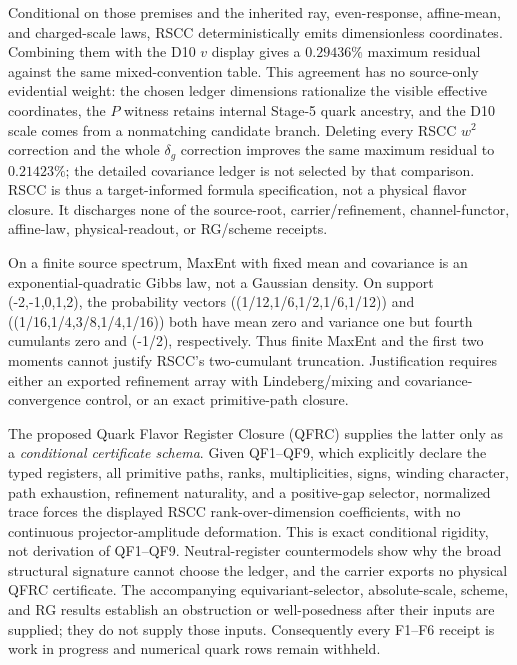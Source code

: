 \documentclass[11pt]{article}
\begin{document}
Conditional on those premises and the inherited ray, even-response, affine-mean, and charged-scale
laws, RSCC deterministically emits dimensionless coordinates.  Combining them with the D10
\(v\) display gives a \(0.29436\%\) maximum residual against the same mixed-convention table. This
agreement has no source-only evidential weight: the chosen ledger dimensions rationalize the visible
effective coordinates, the \(P\) witness retains internal Stage-5 quark ancestry, and the D10 scale
comes from a nonmatching candidate branch.  Deleting every RSCC \(w^2\) correction and
the whole \(\delta_g\) correction improves the same maximum residual to
\(0.21423\%\); the detailed covariance ledger is not selected by that comparison.  RSCC is thus a
target-informed formula specification, not a physical flavor closure. It
discharges none of the source-root, carrier/refinement, channel-functor, affine-law, physical-readout,
or RG/scheme receipts.

On a finite source spectrum, MaxEnt with fixed mean and covariance is an
exponential-quadratic Gibbs law, not a Gaussian density.  On support
({-2,-1,0,1,2}), the probability vectors
((1/12,1/6,1/2,1/6,1/12)) and
((1/16,1/4,3/8,1/4,1/16)) both have mean zero and variance one but fourth cumulants
zero and (-1/2), respectively.  Thus finite MaxEnt and the first two moments cannot justify
RSCC's two-cumulant truncation. Justification requires either an exported refinement
array with Lindeberg/mixing and covariance-convergence control, or an exact primitive-path closure.

The proposed Quark Flavor Register Closure (QFRC) supplies the latter only as a
\emph{conditional certificate schema}.  Given QF1--QF9, which explicitly declare the typed
registers, all primitive paths, ranks, multiplicities, signs, winding character, path exhaustion,
refinement naturality, and a positive-gap selector, normalized trace forces the displayed RSCC
rank-over-dimension coefficients, with no continuous projector-amplitude deformation.  This is
exact conditional rigidity, not derivation of QF1--QF9.  Neutral-register countermodels show why
the broad structural signature cannot choose the ledger, and the carrier exports no
physical QFRC certificate.  The accompanying equivariant-selector, absolute-scale, scheme, and RG
results establish an obstruction or well-posedness after their inputs are supplied;
they do not supply those inputs.  Consequently every F1--F6 receipt is work in progress and numerical
quark rows remain withheld.
\end{document}
